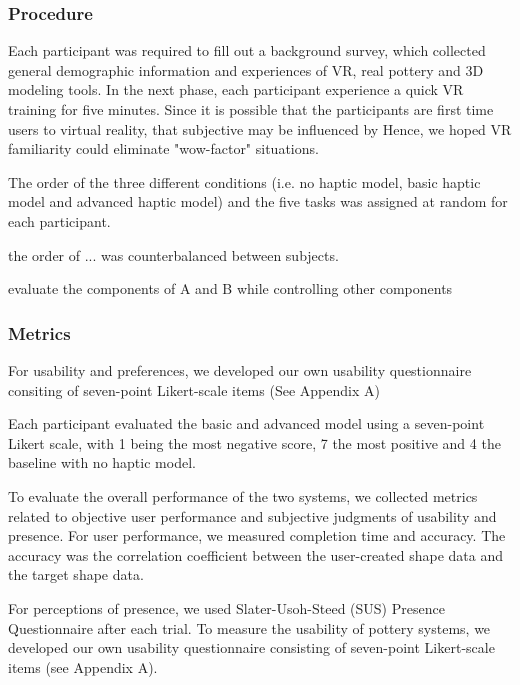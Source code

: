 \documentclass{svjour3}                     %
\begin{document}
\subsubsection{Procedure}
Each participant was required to fill out a background survey, which collected general demographic information and experiences of VR, real pottery and 3D modeling tools.
In the next phase, each participant experience a quick VR training for five minutes.
Since it is possible that the participants are first time users to virtual reality, that subjective may be influenced by 
Hence, we hoped VR familiarity could eliminate "wow-factor" situations.

The order of the three different conditions (i.e. no haptic model, basic haptic model and advanced haptic model) and the five tasks was assigned at random for each participant.

the order of ... was counterbalanced between subjects.

evaluate the components of A and B while controlling other components













\subsubsection{Metrics}

For usability and preferences, we developed our own usability questionnaire consiting of seven-point Likert-scale items (See Appendix A)

%
Each participant evaluated the basic and advanced model using a seven-point Likert scale, with 1 being the most negative score, 7 the most positive and 4 the baseline with no haptic model.


To evaluate the overall performance of the two systems, we collected metrics related to objective user performance and subjective judgments of usability and presence.
For user performance, we measured completion time and accuracy.
The accuracy was the correlation coefficient between the user-created shape data and the target shape data.

For perceptions of presence, we used Slater-Usoh-Steed (SUS) Presence Questionnaire after each trial.
To measure the usability of pottery systems, we developed our own usability questionnaire consisting of seven-point Likert-scale items (see Appendix A).
\end{document}
